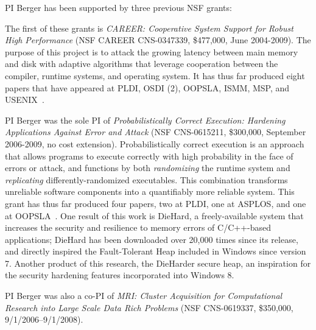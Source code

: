 PI Berger has been supported by three previous NSF grants:

The first of these grants is
\emph{CAREER: Cooperative System Support for Robust High Performance}
(NSF CAREER CNS-0347339, \$477,000, June 2004-2009). The purpose of this project is to attack the growing
latency between main memory and disk with adaptive algorithms that
leverage cooperation between the compiler, runtime systems, and
operating system. It has thus far produced eight papers that have
appeared at PLDI, OSDI (2), OOPSLA, ISMM, MSP, and USENIX~\cite{feng05,hert05,hert05a,yang04,1267316,transparent2006usenix,flux06usenix,DBLP:conf/osdi/YangLBKM08}.

PI Berger was the sole PI of \emph{Probabilistically Correct
  Execution: Hardening Applications Against Error and Attack} (NSF
  CNS-0615211, \$300,000, September 2006-2009, no cost extension).
  Probabilistically correct execution is an approach that allows
  programs to execute correctly with high probability in the face of
  errors or attack, and functions by both \emph{randomizing} the
  runtime system and \emph{replicating} differently-randomized
  executables. This combination transforms unreliable software
  components into a quantifiably more reliable system. This grant has
  thus far produced four papers, two at PLDI, one at ASPLOS, and one
  at
  OOPSLA~\cite{1134000,1250736,1346296,DBLP:conf/oopsla/BergerYLN09}. One
  result of this work is DieHard, a freely-available system that
  increases the security and resilience to memory errors of
  C/C++-based applications; DieHard has been downloaded over 20,000
  times since its release, and directly inspired the Fault-Tolerant
  Heap included in Windows since version 7. Another product of this
  research, the DieHarder secure heap, an inspiration for the security
  hardening features incorporated into Windows 8.

PI Berger was also a co-PI of \emph{MRI: Cluster Acquisition for
Computational Research into Large Scale Data Rich Problems} (NSF
CNS-0619337, \$350,000, 9/1/2006--9/1/2008).

